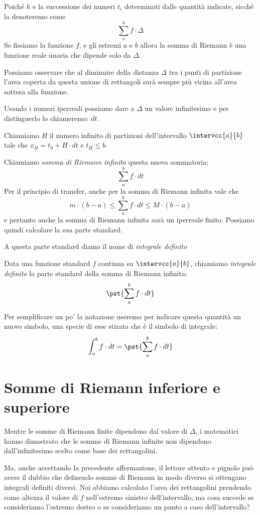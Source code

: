 Poiché \(h\) e la successione dei numeri \(t_i\) determinati 
dalle quantità indicate, sicché la denoteremo come 
\[\sum_a^b f \cdot \Delta\] 
Se fissiamo la funzione \(f\), e gli estremi \(a\) e \(b\) allora la somma di 
Riemann è una funzione reale unaria che dipende solo da \(\Delta\). 


Possiamo osservare che al diminuire della distanza \(\Delta\) tra i punti di 
partizione l'area coperta da questa unione di rettangoli sarà sempre più 
vicina all'area sottesa alla funzione.

Usando i numeri iperreali possiamo dare a \(\Delta\) un valore infinitesimo e 
per distinguerlo lo chiameremo: \(dt\).

Chiamiamo \(H\) il numero infinito di partizioni dell'intervallo 
\(\intervcc{a}{b}\) tale che \(x_H = t_0 + H \cdot dt\) e \(t_H \le b\).

Chiamiamo \emph{somma di Riemann infinita} questa nuova sommatoria:
\[\sum_a^b f \cdot dt\]
Per il principio di transfer, anche per la somma di Riemann infinita vale 
che 
\[m \cdot (b - a) \le  \sum_a^b f \cdot dt  \le M\cdot(b - a)\]
e pertanto anche la somma di Riemann infinita sarà un iperreale finito. 
Possiamo quindi calcolare la sua parte standard. 

A questa parte standard diamo il nome di \emph{integrale definito}
\begin{definizione}
Data una funzione standard \(f\) continua su \(\intervcc{a}{b}\),
chiamiamo \emph{integrale definito} la parte standard della 
somma di Riemann infinita:
\[\pst{\sum_a^b f \cdot dt}\]
\end{definizione}

Per semplificare un po' la notazione useremo per indicare questa quantità un 
nuovo simbolo, una specie di esse stirata che è il simbolo di integrale:
\[\int_a^b f \cdot dt = \pst{\sum_a^b f \cdot dt}\]

\section{Somme di Riemann inferiore e superiore}
\label{sec:integrali_somme_riemann}

Mentre le somme di Riemann finite dipendono dal valore di \(\Delta\), i 
matematici hanno dimostrato che le somme di Riemann infinite non dipendono 
dall'infinitesimo scelto come base dei rettangolini.

Ma, anche accettando la precedente affermazione, il lettore attento e pignolo 
può avere il dubbio che definendo somme di 
Riemann in modo diverso si ottengano integrali definiti diversi. 
Noi abbiamo 
calcolato l'area dei rettangolini prendendo come altezza il valore di \(f\) 
nell'estremo sinistro dell'intervallo, ma cosa succede se consideriamo 
l'estremo destro o se consideriamo un punto a caso dell'intervallo?

